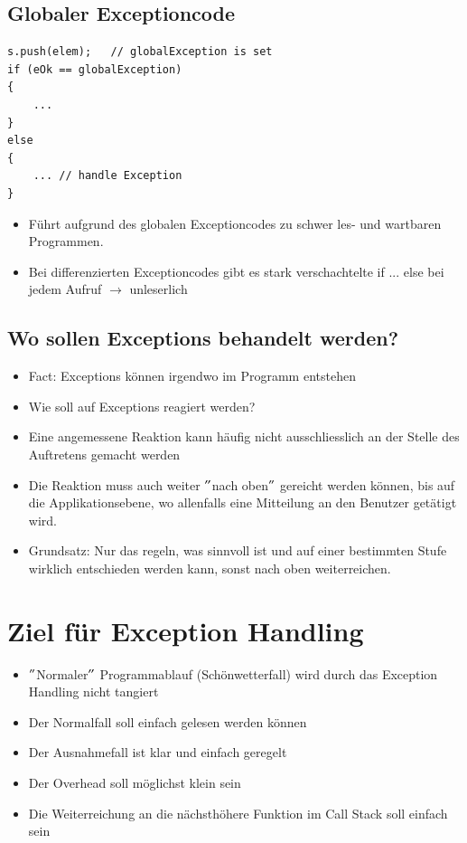 \subsection{Globaler Exceptioncode}
\begin{multicols}{2}
\begin{minipage}{\linewidth}
\vspace{-2\baselineskip}
\begin{lstlisting}
s.push(elem);	// globalException is set
if (eOk == globalException)
{
	...
}
else
{
	... // handle Exception
}
\end{lstlisting}	
\end{minipage}
\vfill\null
\columnbreak
\begin{itemize}
	\item Führt aufgrund des globalen Exceptioncodes zu schwer les- und wartbaren Programmen.
	\item Bei differenzierten Exceptioncodes gibt es stark verschachtelte if ... else bei jedem Aufruf $\rightarrow$ unleserlich
\end{itemize}
\end{multicols}

\subsection{Wo sollen Exceptions behandelt werden?}
\begin{itemize}
	\item Fact: Exceptions können irgendwo im Programm entstehen
	\item Wie soll auf Exceptions reagiert werden?
	\item Eine angemessene Reaktion kann häufig nicht ausschliesslich an der Stelle des Auftretens gemacht werden
	\item Die Reaktion muss auch weiter $"$nach oben$"$ gereicht werden können, bis auf die Applikationsebene, wo allenfalls eine Mitteilung an den Benutzer getätigt wird.
	\item[\-] \begin{hinweis}
		Grundsatz: Nur das regeln, was sinnvoll ist und auf einer bestimmten Stufe wirklich entschieden werden kann, sonst nach oben weiterreichen.
	\end{hinweis}
\end{itemize}

\section{Ziel für Exception Handling}
\begin{itemize}
	\item $"$Normaler$"$ Programmablauf (Schönwetterfall) wird durch das Exception Handling nicht tangiert
	\item Der Normalfall soll einfach gelesen werden können
	\item Der Ausnahmefall ist klar und einfach geregelt
	\item Der Overhead soll möglichst klein sein
	\item Die Weiterreichung an die nächsthöhere Funktion im Call Stack soll einfach sein
\end{itemize}

